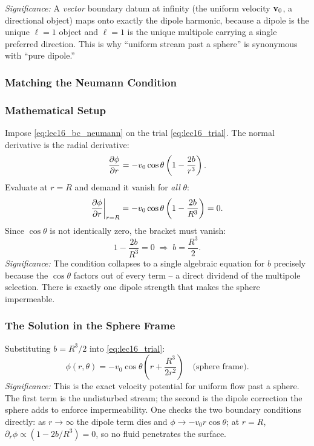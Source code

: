 \documentclass[../main.tex]{subfiles}
\begin{document}
\textit{Significance:} A \emph{vector} boundary datum at infinity (the uniform velocity $\mathbf{v}_0$, a directional object) maps onto exactly the dipole harmonic, because a dipole is the unique $\ell=1$ object and $\ell=1$ is the unique multipole carrying a single preferred direction. This is why ``uniform stream past a sphere'' is synonymous with ``pure dipole.''

\subsubsection{Matching the Neumann Condition}

\subsubsection*{Mathematical Setup}
Impose \eqref{eq:lec16_bc_neumann} on the trial \eqref{eq:lec16_trial}. The normal derivative is the radial derivative:
\begin{equation}
  \pdv{\phi}{r} = -v_0\cos\theta\left(1 - \frac{2b}{r^3}\right).
  \label{eq:lec16_dphidr}
\end{equation}
Evaluate at $r=R$ and demand it vanish for \emph{all} $\theta$:
\begin{equation}
  \pdv{\phi}{r}\bigg|_{r=R} = -v_0\cos\theta\left(1 - \frac{2b}{R^3}\right) = 0.
  \label{eq:lec16_neumann_match}
\end{equation}
Since $\cos\theta$ is not identically zero, the bracket must vanish:
\begin{equation}
  1 - \frac{2b}{R^3} = 0 \;\Longrightarrow\; b = \frac{R^3}{2}.
  \label{eq:lec16_solve_b}
\end{equation}
\textit{Significance:} The condition collapses to a single algebraic equation for $b$ precisely because the $\cos\theta$ factors out of every term -- a direct dividend of the multipole selection. There is exactly one dipole strength that makes the sphere impermeable.

\subsubsection{The Solution in the Sphere Frame}

Substituting $b=R^3/2$ into \eqref{eq:lec16_trial}:
\begin{equation}
  \boxed{\phi(r,\theta) = -v_0\cos\theta\left(r + \frac{R^3}{2r^2}\right) \quad\text{(sphere frame)}.}
  \label{eq:lec16_phi_sphereframe}
\end{equation}
\textit{Significance:} This is the exact velocity potential for uniform flow past a sphere. The first term is the undisturbed stream; the second is the dipole correction the sphere adds to enforce impermeability. One checks the two boundary conditions directly: as $r\to\infty$ the dipole term dies and $\phi\to-v_0 r\cos\theta$; at $r=R$, $\partial_r\phi\propto(1-2b/R^3)=0$, so no fluid penetrates the surface.
\end{document}
